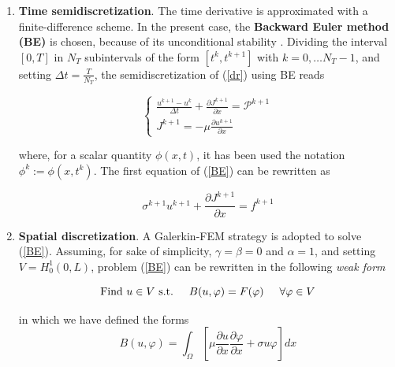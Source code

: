 \documentclass[12pt, a4paper]{report}
\begin{document}
\begin{enumerate}
	\item \textbf{Time semidiscretization}. The time derivative is approximated with a finite-difference scheme. In the present case, the \textbf{Backward Euler method (BE)} is chosen, because of its unconditional stability \cite{39}. %
	 Dividing the interval $[0,T]$ in $N_T$ subintervals of the form $[t^k, t^{k+1}]$ with $ k=0, \dots N_T-1$, and setting $\Delta t = \frac{T}{N_T} $, the semidiscretization of (\ref{dr}) using BE reads
	
	\begin{equation}
	\begin{cases}
	\displaystyle \frac{u^{k+1} - u^k}{\Delta t} +\displaystyle \frac{\partial J^{k+1}}{\partial x} = \mathcal{P}^{k+1}  \\
	J^{k+1} =  - \displaystyle \mu \frac{\partial u^{k+1}}{\partial x} 
	\end{cases} \label{BE}
	\end{equation}
	
	where, for a scalar quantity $\phi(x,t)$, it has been used the notation $ \phi^k := \phi(x,t^k) $. The first equation of (\ref{BE}) can be rewritten as
	
	\begin{equation}
	\sigma ^{k+1} u^{k+1} +\frac{\partial J^{k+1}}{\partial x} = f^{k+1} 
	\end{equation}
	
	\item \textbf{Spatial discretization}. A Galerkin-FEM strategy is adopted to solve (\ref{BE}).  Assuming, for sake of simplicity, $\gamma = \beta = 0$ and $\alpha =1$, and setting $V = H_0^1(0,L)$,  problem (\ref{BE}) can be rewritten in the following \textit{weak form} \cite{40} %
	
	\begin{equation}
	\text{Find $u \in V$ s.t.} \hspace{0.5cm} B(u,\varphi) = F(\varphi) \hspace{0.5cm} \forall \varphi \in V
	\label{variational}
	\end{equation}
	
	in which we have defined the forms
	\begin{equation}
	B(u,\varphi) = \int_{\Omega}\left[\mu \frac{\partial u}{\partial x}  \frac{\partial \varphi}{\partial x} + \sigma u \varphi \right]  dx
	\end{equation}
	

\end{enumerate}
\end{document}
